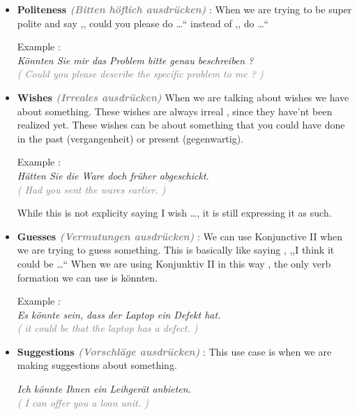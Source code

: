 \documentclass[a4paper,twocolumn,10pt]{article}
\newcommand{\newpar}
{\par \vspace{0.3cm}}
\begin{document}
\begin{itemize}[noitemsep]

	\item \textbf{Politeness \textit{ \textcolor{gray}{(Bitten höflich
					ausdrücken)} }} : When we are trying to be super polite and
		say ,, could you please do \ldots `` instead of ,, do \ldots ``\newpar


	\noindent
	Example :\\
	\textit{Könnten Sie mir das Problem bitte genau beschreiben ?}\\
	\textcolor{gray} { \textit{( Could you please describe the specific problem to me ? )} } \newpar


	\item \textbf{Wishes \textit{ \textcolor{gray}{(Irreales ausdrücken)} }}
	When we are talking about wishes we have about something. These wishes are
	always irreal , since they have'nt been realized yet. These wishes can be
	about something that you could have done in the past (vergangenheit) or
	present (gegenwartig).\newpar


\noindent
Example :\\
\textit{Hätten Sie die Ware doch früher abgeschickt.}\\
\textcolor{gray} { \textit{( Had you sent the wares earlier. )} } \newpar
While this is not explicity saying I wish \ldots , it is still expressing it as
such.\newpar




	\item \textbf{Guesses \textit{ \textcolor{gray}{(Vermutungen ausdrücken)} }}
: We can use Konjunctive II when we are trying to guess something. This is
basically like saying , ,,I think it could be \ldots `` When we are using
Konjunktiv II in this way , the only verb formation we can use is könnten.\newpar


\noindent
Example :\\
\textit{Es könnte sein, dass der Laptop ein Defekt hat.}\\
\textcolor{gray} { \textit{( it could be that the laptop has a defect. )} } \newpar 
	\item \textbf{Suggestions \textit{ \textcolor{gray}{(Vorschläge ausdrücken)}
			}} : This use case is when we are making suggestions about
		something.


\noindent
\textit{Ich könnte Ihnen ein Leihgerät anbieten.}\\
\textcolor{gray} { \textit{( I can offer you a loan unit. )} } \newpar




\end{itemize}
\end{document}
